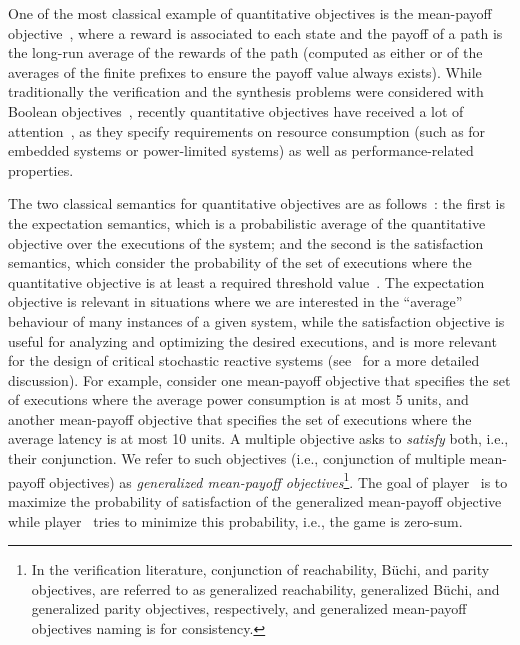 \documentclass{article}
\begin{document}
\smallskip{}
One of the most classical example of quantitative objectives is the mean-payoff 
objective~\cite{FV97,Puterman,Gi57,EM79}, where a reward is associated to each
state and the payoff of a path is the long-run average of the rewards of the 
path (computed as either  or  of the averages of the finite 
prefixes to ensure the payoff value always exists).
While traditionally the verification and the synthesis problems were considered
with Boolean objectives~\cite{PnueliRosner,RamadgeWonham,KV05}, recently quantitative objectives have 
received a lot of attention~\cite{BCHJ09,CCHRS11,BBFR13}, as they specify requirements 
on resource consumption (such as for embedded systems or power-limited systems) as well 
as performance-related properties.

\smallskip{}
The two classical semantics for quantitative objectives are as follows~\cite{BBCFK14}:
the first is the expectation semantics, which is a probabilistic average of 
the quantitative objective over the executions of the system;
and the second is the satisfaction semantics, which consider the probability of
the set of executions where the quantitative objective is at least a required
threshold value~.
The expectation objective is relevant in situations where we are interested 
in the ``average'' behaviour of many instances of a given system, while 
the satisfaction objective is useful for analyzing and optimizing the desired
executions, and is more relevant for the design of critical stochastic reactive 
systems (see~\cite{BBCFK14} for a more detailed discussion).
For example, consider one mean-payoff objective that specifies the set of 
executions where the average power consumption is at most 5 units, and 
another mean-payoff objective that specifies the set of executions where 
the average latency is at most 10 units. 
A multiple objective asks to \emph{satisfy} both, i.e., their conjunction. 
We refer to such objectives (i.e., conjunction of multiple mean-payoff 
objectives) as {\em generalized mean-payoff objectives}\footnote{In the verification
literature, conjunction of reachability, B\"uchi, and parity objectives, 
are referred to as generalized reachability, generalized B\"uchi, and generalized
parity objectives, respectively, and generalized mean-payoff objectives naming is 
for consistency.}. 
The goal of player~ is to maximize the probability of satisfaction 
of the generalized mean-payoff objective while player~ tries to 
minimize this probability, i.e., the game is zero-sum.
\end{document}
